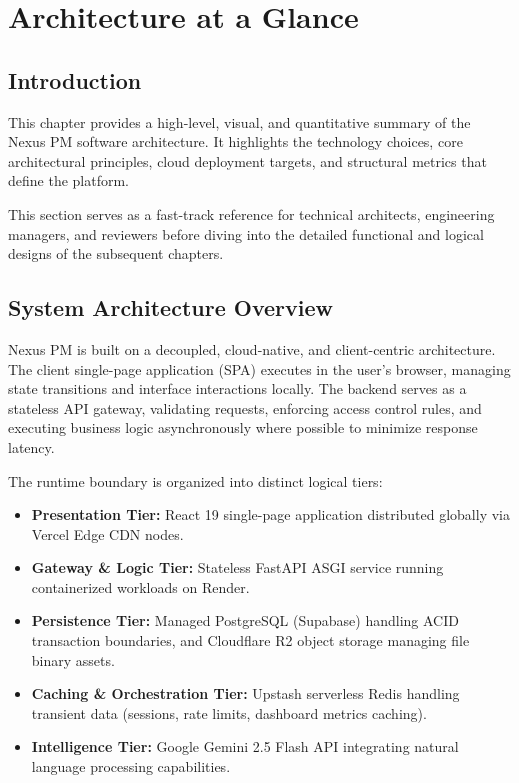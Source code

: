 \chapter{Architecture at a Glance}
\label{chap:architecture-at-a-glance}

\section{Introduction}
This chapter provides a high-level, visual, and quantitative summary of the Nexus PM software architecture. It highlights the technology choices, core architectural principles, cloud deployment targets, and structural metrics that define the platform. 

This section serves as a fast-track reference for technical architects, engineering managers, and reviewers before diving into the detailed functional and logical designs of the subsequent chapters.

\section{System Architecture Overview}
Nexus PM is built on a decoupled, cloud-native, and client-centric architecture. The client single-page application (SPA) executes in the user's browser, managing state transitions and interface interactions locally. The backend serves as a stateless API gateway, validating requests, enforcing access control rules, and executing business logic asynchronously where possible to minimize response latency. 

The runtime boundary is organized into distinct logical tiers:
\begin{itemize}
    \item \textbf{Presentation Tier:} React 19 single-page application distributed globally via Vercel Edge CDN nodes.
    \item \textbf{Gateway \& Logic Tier:} Stateless FastAPI ASGI service running containerized workloads on Render.
    \item \textbf{Persistence Tier:} Managed PostgreSQL (Supabase) handling ACID transaction boundaries, and Cloudflare R2 object storage managing file binary assets.
    \item \textbf{Caching \& Orchestration Tier:} Upstash serverless Redis handling transient data (sessions, rate limits, dashboard metrics caching).
    \item \textbf{Intelligence Tier:} Google Gemini 2.5 Flash API integrating natural language processing capabilities.
\end{itemize}

